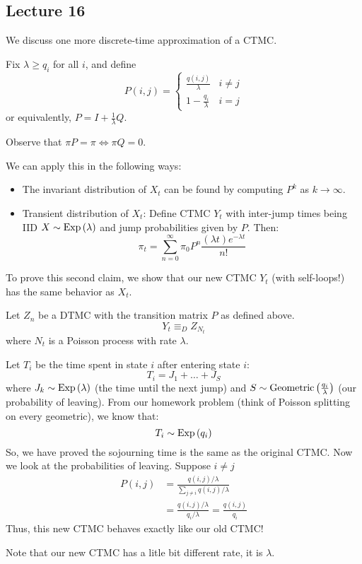 \subsection{Lecture 16}

We discuss one more discrete-time approximation of a CTMC.
\begin{definition}
    Fix $\lambda \geq q_i$ for all $i$, and define 
    \[ P(i, j) = \begin{cases}
        \frac{q(i, j)}{\lambda} & i \neq j \\
        1 - \frac{q_i}{\lambda} & i = j
    \end{cases} \]
    or equivalently, $P = I + \frac{1}{\lambda} Q$.
    
    Observe that $\pi P = \pi \iff \pi Q = 0$.
\end{definition}

We can apply this in the following ways:
\begin{itemize}
    \item The invariant distribution of $X_t$ can be found by computing $P^k$ as $k \to \infty$.
    \item Transient distribution of $X_t$: Define CTMC $Y_t$ with inter-jump times being IID $X \sim \text{Exp}\left( \lambda \right)$ and jump probabilities given by $P$. Then:
    \[ \pi_t = \sum_{n = 0}^{\infty} \pi_0 P^n \frac{(\lambda t) e^{-\lambda t}}{n!} \]
\end{itemize}

To prove this second claim, we show that our new CTMC $Y_t$ (with self-loops!) has the same behavior as $X_t$.
\begin{proof*}
    Let $Z_n$ be a DTMC with the transition matrix $P$ as defined above.
    \[ Y_t \equiv_D Z_{N_t} \]
    where $N_t$ is a Poisson process with rate $\lambda$.

    Let $T_i$ be the time spent in state $i$ after entering state $i$:
    \[ T_i = J_1 + \dots + J_S \]
    where $J_k \sim \text{Exp}\left( \lambda \right)$ (the time until the next jump) and $S \sim \text{Geometric}\left( \frac{q_i}{\lambda} \right)$ (our probability of leaving).
    From our homework problem (think of Poisson splitting on every geometric), we know that:
    \[ T_i \sim \text{Exp}\left( q_i \right) \]
    So, we have proved the sojourning time is the same as the original CTMC. Now we look at the probabilities of leaving. Suppose $i \neq j$
    \begin{align*}
        P(i, j) &= \frac{q(i,j) / \lambda}{\sum_{j \neq i} q(i, j) / \lambda} \\
        &= \frac{q(i, j) / \lambda}{q_i/\lambda} = \frac{q(i,j)}{q_i}
    \end{align*}
    Thus, this new CTMC behaves exactly like our old CTMC!

    Note that our new CTMC has a litle bit different rate, it is $\lambda$.
\end{proof*}

